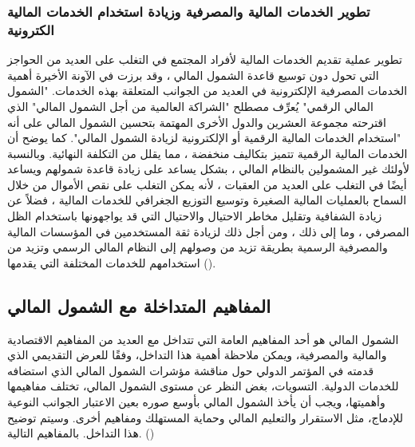 \documentclass[10pt,a4paper]{report}
\begin{document}
\begin{doublespacing}
\subsubsection{تطوير الخدمات المالية والمصرفية وزيادة استخدام الخدمات المالية الكترونية}
تطوير عملية تقديم الخدمات المالية لأفراد المجتمع في التغلب على العديد من الحواجز التي تحول دون توسيع قاعدة الشمول المالي ، وقد برزت في الآونة الأخيرة أهمية الخدمات المصرفية الإلكترونية في العديد من الجوانب المتعلقة بهذه الخدمات. "الشمول المالي الرقمي" يُعرِّف مصطلح "الشراكة العالمية من أجل الشمول المالي" الذي اقترحته مجموعة العشرين والدول الأخرى المهتمة بتحسين الشمول المالي على أنه "استخدام الخدمات المالية الرقمية أو الإلكترونية لزيادة الشمول المالي". كما يوضح أن الخدمات المالية الرقمية تتميز بتكاليف منخفضة ، مما يقلل من التكلفة النهائية. وبالنسبة لأولئك غير المشمولين بالنظام المالي ، بشكل يساعد على زيادة قاعدة شمولهم ويساعد أيضًا في التغلب على العديد من العقبات ، لأنه يمكن التغلب على نقص الأموال من خلال السماح بالعمليات المالية الصغيرة وتوسيع التوزيع الجغرافي للخدمات المالية ، فضلاً عن زيادة الشفافية وتقليل مخاطر الاحتيال والاحتيال التي قد يواجهونها باستخدام الظل المصرفي ، وما إلى ذلك ، ومن أجل ذلك لزيادة ثقة المستخدمين في المؤسسات المالية والمصرفية الرسمية بطريقة تزيد من وصولهم إلى النظام المالي الرسمي وتزيد من استخدامهم للخدمات المختلفة التي يقدمها ().
\subsection{المفاهيم المتداخلة مع الشمول المالي}
الشمول المالي هو أحد المفاهيم العامة التي تتداخل مع العديد من المفاهيم الاقتصادية والمالية والمصرفية، ويمكن ملاحظة أهمية هذا التداخل، وفقًا للعرض التقديمي الذي قدمته  في المؤتمر الدولي حول مناقشة مؤشرات الشمول المالي الذي استضافه  للخدمات الدولية. التسويات، بغض النظر عن مستوى الشمول المالي، تختلف مفاهيمها وأهميتها، ويجب أن يأخذ الشمول المالي بأوسع صوره بعين الاعتبار الجوانب النوعية للإدماج، مثل الاستقرار والتعليم المالي وحماية المستهلك ومفاهيم أخرى. وسيتم توضيح هذا التداخل. بالمفاهيم التالية. ()

\end{doublespacing}
\end{document}
